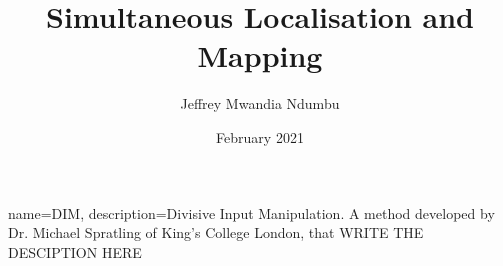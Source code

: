 \documentclass[11pt]{m-report}
\title{Simultaneous Localisation and Mapping}
\author{Jeffrey Mwandia Ndumbu }
\date{February 2021}
\begin{document}
\createFrontMatter
\onehalfspacing
\tableofcontents
\doublespacing




\printglossary
{}
{
    name=DIM,
    description={Divisive Input Manipulation. A method developed by Dr. Michael Spratling of King's College London, that WRITE THE DESCIPTION HERE}
}



\end{document}
